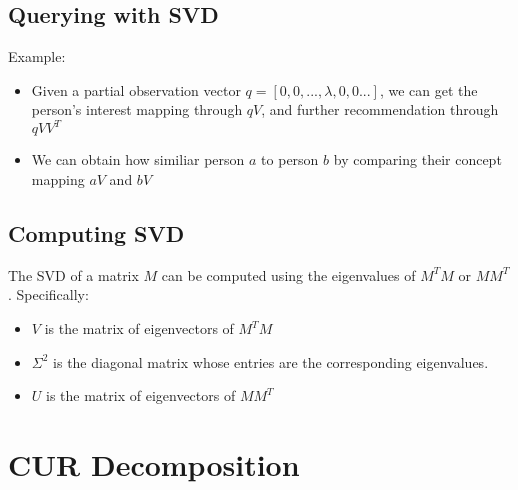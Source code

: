 \subsection{Querying with SVD} 
Example: 
    \begin{itemize}
        \item Given a partial observation vector $q = [0, 0, ..., \lambda, 0, 0...]$, we can get the person's interest mapping through $qV$, and further recommendation through $qVV^T$
        \item We can obtain how similiar person $a$ to person $b$ by comparing their concept mapping $aV$ and $bV$
    \end{itemize}

\subsection{Computing SVD} 
The SVD of a matrix $M$ can be computed using the eigenvalues of $M^TM$ or $MM^T$. Specifically: 
    \begin{itemize}
        \item $V$ is the matrix of eigenvectors of $M^T M$
        \item $\Sigma^2$ is the diagonal matrix whose entries are the corresponding eigenvalues. 
        \item $U$ is the matrix of eigenvectors of $MM^T$
    \end{itemize}
    
\section{CUR Decomposition} 
